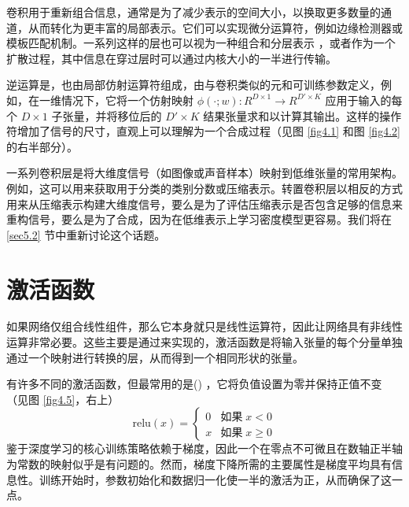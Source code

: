 卷积用于重新组合信息，通常是为了减少表示的空间大小，以换取更多数量的通道，从而转化为更丰富的局部表示。它们可以实现微分运算符，例如边缘检测器或模板匹配机制。一系列这样的层也可以视为一种组合和分层表示 \citep{arxiv-1311.2901}，或者作为一个扩散过程，其中信息在穿过层时可以通过内核大小的一半进行传输。

逆运算是，也由局部仿射运算符组成，由与卷积类似的元和可训练参数定义，例如，在一维情况下，它将一个仿射映射 $\phi(\cdot;w):R^{D \times 1} \to R^{D' \times K}$ 应用于输入的每个 $D \times 1$ 子张量，并将移位后的 $D' \times K$ 结果张量求和以计算其输出。这样的操作符增加了信号的尺寸，直观上可以理解为一个合成过程（见图 \ref{fig4.1} 和图 \ref{fig4.2} 的右半部分）。

一系列卷积层是将大维度信号（如图像或声音样本）映射到低维张量的常用架构。例如，这可以用来获取用于分类的类别分数或压缩表示。转置卷积层以相反的方式用来从压缩表示构建大维度信号，要么是为了评估压缩表示是否包含足够的信息来重构信号，要么是为了合成，因为在低维表示上学习密度模型更容易。我们将在 \ref{sec5.2} 节中重新讨论这个话题。

\section{激活函数}\label{sec4.3}

如果网络仅组合线性组件，那么它本身就只是线性运算符，因此让网络具有非线性运算非常必要。这些主要是通过来实现的，激活函数是将输入张量的每个分量单独通过一个映射进行转换的层，从而得到一个相同形状的张量。

有许多不同的激活函数，但最常用的是() \citep{glorot11a}，它将负值设置为零并保持正值不变（见图 \ref{fig4.5}，右上）
$$
\text{relu}(x) = \begin{cases}
    0 &\text{如果}\; x < 0 \\
    x &\text{如果}\; x \ge 0
 \end{cases}
 $$
 鉴于深度学习的核心训练策略依赖于梯度，因此一个在零点不可微且在数轴正半轴为常数的映射似乎是有问题的。然而，梯度下降所需的主要属性是梯度平均具有信息性。训练开始时，参数初始化和数据归一化使一半的激活为正，从而确保了这一点。


